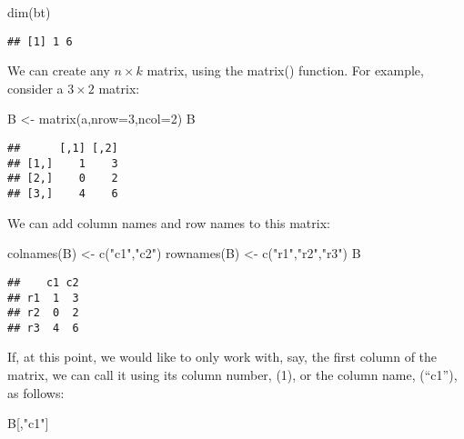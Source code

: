 \documentclass[
  oneside]{book}
\newenvironment{Shaded}{\begin{snugshade}}{\end{snugshade}}
\newcommand{\AttributeTok}[1]{\textcolor[rgb]{0.77,0.63,0.00}{#1}}
\newcommand{\DecValTok}[1]{\textcolor[rgb]{0.00,0.00,0.81}{#1}}
\newcommand{\FunctionTok}[1]{\textcolor[rgb]{0.00,0.00,0.00}{#1}}
\newcommand{\NormalTok}[1]{#1}
\newcommand{\OtherTok}[1]{\textcolor[rgb]{0.56,0.35,0.01}{#1}}
\newcommand{\StringTok}[1]{\textcolor[rgb]{0.31,0.60,0.02}{#1}}
\begin{document}
\begin{Shaded}
\begin{Highlighting}[]
\FunctionTok{dim}\NormalTok{(bt)}
\end{Highlighting}
\end{Shaded}

\begin{verbatim}
## [1] 1 6
\end{verbatim}

We can create any \(n \times k\) matrix, using the matrix() function. For example, consider a \(3 \times 2\) matrix:

\begin{Shaded}
\begin{Highlighting}[]
\NormalTok{B }\OtherTok{\textless{}{-}} \FunctionTok{matrix}\NormalTok{(a,}\AttributeTok{nrow=}\DecValTok{3}\NormalTok{,}\AttributeTok{ncol=}\DecValTok{2}\NormalTok{)}
\NormalTok{B}
\end{Highlighting}
\end{Shaded}

\begin{verbatim}
##      [,1] [,2]
## [1,]    1    3
## [2,]    0    2
## [3,]    4    6
\end{verbatim}

We can add column names and row names to this matrix:

\begin{Shaded}
\begin{Highlighting}[]
\FunctionTok{colnames}\NormalTok{(B) }\OtherTok{\textless{}{-}} \FunctionTok{c}\NormalTok{(}\StringTok{"c1"}\NormalTok{,}\StringTok{"c2"}\NormalTok{)}
\FunctionTok{rownames}\NormalTok{(B) }\OtherTok{\textless{}{-}} \FunctionTok{c}\NormalTok{(}\StringTok{"r1"}\NormalTok{,}\StringTok{"r2"}\NormalTok{,}\StringTok{"r3"}\NormalTok{)}
\NormalTok{B}
\end{Highlighting}
\end{Shaded}

\begin{verbatim}
##    c1 c2
## r1  1  3
## r2  0  2
## r3  4  6
\end{verbatim}

If, at this point, we would like to only work with, say, the first column of the matrix, we can call it using its column number, (1), or the column name, (``c1''), as follows:

\begin{Shaded}
\begin{Highlighting}[]
\NormalTok{B[,}\StringTok{"c1"}\NormalTok{]}
\end{Highlighting}
\end{Shaded}
\end{document}
